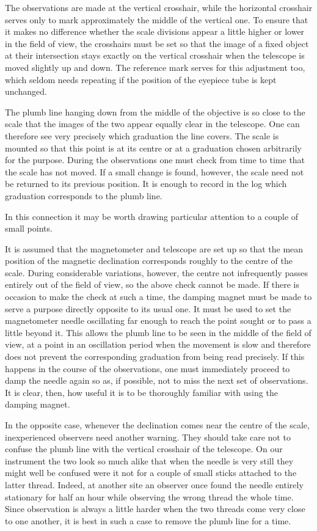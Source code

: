 The observations are made at the vertical crosshair, while the horizontal crosshair serves only to mark approximately the middle of the vertical one. To ensure that it makes no difference whether the scale divisions appear a little higher or lower in the field of view, the crosshairs must be set so that the image of a fixed object at their intersection stays exactly on the vertical crosshair when the telescope is moved slightly up and down. The reference mark serves for this adjustment too, which seldom needs repeating if the position of the eyepiece tube is kept unchanged.

The plumb line hanging down from the middle of the objective is so close to the scale that the images of the two appear equally clear in the telescope. One can therefore see very precisely which graduation the line covers. The scale is mounted so that this point is at its centre or at a graduation chosen arbitrarily for the purpose. During the observations one must check from time to time that the scale has not moved. If a small change is found, however, the scale need not be returned to its previous position. It is enough to record in the log which graduation corresponds to the plumb line.

In this connection it may be worth drawing particular attention to a couple of small points.

It is assumed that the magnetometer and telescope are set up so that the mean position of the magnetic declination corresponds roughly to the centre of the scale. During considerable variations, however, the centre not infrequently passes entirely out of the field of view, so the above check cannot be made. If there is occasion to make the check at such a time, the damping magnet must be made to serve a purpose directly opposite to its usual one. It must be used to set the magnetometer needle oscillating far enough to reach the point sought or to pass a little beyond it. This allows the plumb line to be seen in the middle of the field of view, at a point in an oscillation period when the movement is slow and therefore does not prevent the corresponding graduation from being read precisely. If this happens in the course of the observations, one must immediately proceed to damp the needle again so as, if possible, not to miss the next set of observations. It is clear, then, how useful it is to be thoroughly familiar with using the damping magnet.

In the opposite case, whenever the declination comes near the centre of the scale, inexperienced observers need another warning. They should take care not to confuse the plumb line with the vertical crosshair of the telescope. On our instrument the two look so much alike that when the needle is very still they might well be confused were it not for a couple of small sticks attached to the latter thread. Indeed, at another site an observer once found the needle entirely stationary for half an hour while observing the wrong thread the whole time. Since observation is always a little harder when the two threads come very close to one another, it is best in such a case to remove the plumb line for a time.

